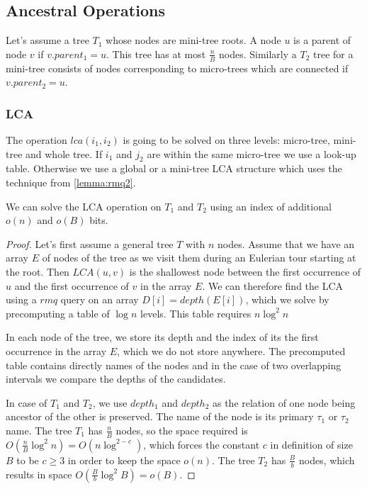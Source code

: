 \begin{algorithmic}
	\State {}
\EndFunction
\end{algorithmic}

\subsection{Ancestral Operations}

Let's assume a tree $T_1$ whose nodes are mini-tree roots.
A node $u$ is a parent of node $v$ if $v.parent_1 = u$.
This tree has at most $\frac{n}{B}$ nodes.
Similarly a $T_2$ tree for a mini-tree consists of nodes corresponding to micro-trees which are connected if $v.parent_2 = u$.

\subsubsection{LCA}

The operation $lca(i_1, i_2)$ is going to be solved on three levels: micro-tree, mini-tree and whole tree.
If $i_1$ and $j_2$ are within the same micro-tree we use a look-up table.
Otherwise we use a global or a mini-tree LCA structure which uses the technique from \ref{lemma:rmq2}.

\begin{lemma}
	We can solve the LCA operation on $T_1$ and $T_2$ using an index of additional $o(n)$ and $o(B)$ bits.
\end{lemma}
\begin{proof}
	Let's first assume a general tree $T$ with $n$ nodes.
	Assume that we have an array $E$ of nodes of the tree as we visit them during an Eulerian tour starting at the root.
	Then $LCA(u, v)$ is the shallowest node between the first occurrence of $u$ and the first occurrence of $v$ in the array $E$.
	We can therefore find the LCA using a $rmq$ query on an array $D[i] = depth(E[i])$, which we solve by precomputing a table of $\log n$ levels.
	This table requires $n \log^2 n$
	
	In each node of the tree, we store its depth and the index of its the first occurrence in the array $E$, which we do not store anywhere.
	The precomputed table contains directly names of the nodes and in the case of two overlapping intervals we compare the depths of the candidates.
	
	In case of $T_1$ and $T_2$, we use $depth_1$ and $depth_2$ as the relation of one node being ancestor of the other is preserved.
	The name of the node is its primary $\tau_1$ or $\tau_2$ name.
	The tree $T_1$ has $\frac{n}{B}$ nodes, so the space required is $O(\frac{n}{B} \log^2 n) = O(n \log^{2 - c})$, which forces the constant $c$ in definition of size $B$ to be $c \ge 3$ in order to keep the space $o(n)$.
	The tree $T_2$ has $\frac{B}{b}$ nodes, which results in space $O(\frac{B}{b} \log^2 B) = o(B)$.
\end{proof}

